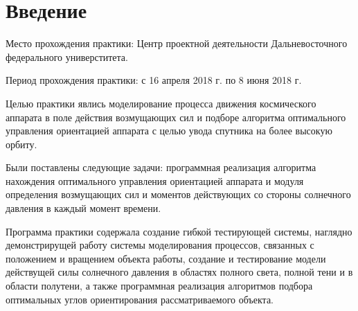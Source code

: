 \usetikzlibrary{calc}
\usetikzlibrary{intersections}
\usetikzlibrary{angles}
\usetikzlibrary{quotes}

\chapter{Введение}
\noindent\indent Место прохождения практики: Центр проектной деятельности
Дальневосточного федерального универститета.\par
    Период прохождения практики: с 16 апреля 2018 г. по 8 июня 2018 г.\par
    Целью практики явлись моделирование процесса движения космического аппарата
в поле действия возмущающих сил и подборе алгоритма оптимального управления
ориентацией аппарата с целью увода спутника на более высокую орбиту.\par
    Были поставлены следующие задачи: программная реализация алгоритма нахождения
оптимального управления ориентацией аппарата и модуля определения возмущающих сил и
моментов действующих со стороны солнечного давления в каждый момент времени.\par
    Программа практики содержала создание гибкой тестирующей системы, наглядно
демонстрирущей работу системы моделирования процессов, связанных с положением и
вращением объекта работы, создание и тестирование модели действущей силы
солнечного давления в областях полного света, полной тени и в области полутени,
а также программная реализация алгоритмов подбора оптимальных углов ориентирования
рассматриваемого объекта.
